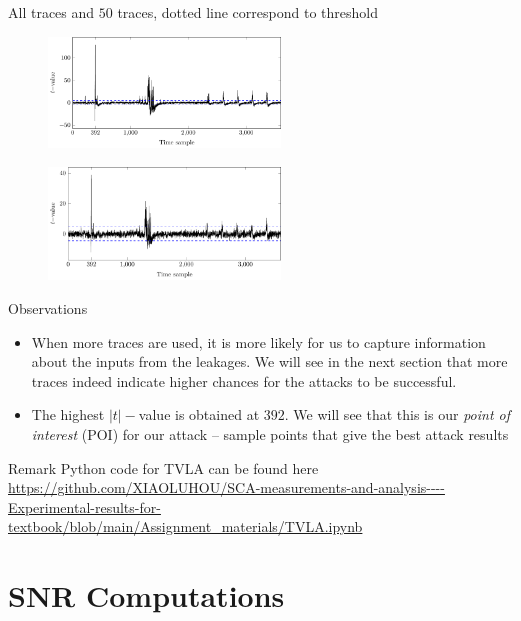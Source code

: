 \begin{frame}{All traces and $50$ traces, dotted line correspond to threshold}
    \begin{figure}[h]
    \centering
    \includegraphics[width=0.55\textwidth]{fig/TVLA_sbox.pdf}
\end{figure}
    \begin{figure}[h]
    \centering
    \includegraphics[width=0.55\textwidth]{fig/TVLA_sbox_less_traces.pdf}
\end{figure}
\end{frame}

\begin{frame}{Observations}
    \begin{itemize}
        \item When more traces are used, it is more likely for us to capture information about the inputs from the leakages.
        We will see in the next section that more traces indeed indicate higher chances for the attacks to be successful.
        \item The highest $|t|-$value is obtained at $392$.
        We will see that this is our \textit{point of interest} (POI) for our attack -- sample points that give the best attack results   
    \end{itemize}
    \begin{alertblock}{Remark}
        Python code for TVLA can be found here\\
        \url{https://github.com/XIAOLUHOU/SCA-measurements-and-analysis----Experimental-results-for-textbook/blob/main/Assignment_materials/TVLA.ipynb}
    \end{alertblock}
\end{frame}

\section{SNR Computations}
\begin{frame}{\VideoName}
    \tableofcontents[currentsection]
\end{frame}


